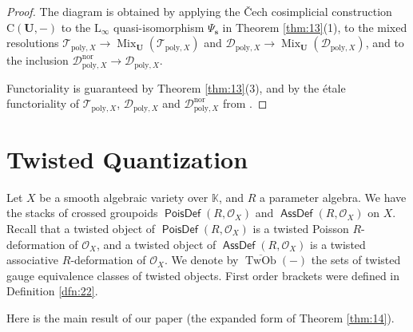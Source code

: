 \documentclass[a4paper, 10pt]{amsart}
\theoremstyle{definition}
\numberwithin{equation}{section}
\newcommand{\opn}{\operatorname}
\newcommand{\cat}[1]{\operatorname{\mathsf{#1}}}
\newcommand{\ol}{\overline}
\newcommand{\mcal}[1]{\mathcal{#1}}
\newcommand{\mrm}[1]{\mathrm{#1}}
\newcommand{\mbb}[1]{\mathbb{#1}}
\newcommand{\bsym}[1]{\boldsymbol{#1}}
\newcommand{\K}{\mbb{K}}
\newcommand{\OX}{\mcal{O}_X}
\newcommand{\twocat}[1]{\operatorname{\bsym{\cat{#1}}}}
\begin{document}
\begin{proof}
The diagram is obtained by applying the \v{C}ech cosimplicial
construction $\mrm{C}(\bsym{U} , -)$ to the  $\mrm{L}_{\infty}$
quasi-isomorphism $\Psi_{\bsym{s}}$
in  Theorem \ref{thm:13}(1), to the mixed resolutions 
$\mcal{T}_{\mrm{poly}, X} \to 
\opn{Mix}_{\bsym{U}}(\mcal{T}_{\mrm{poly}, X})$
and 
$\mcal{D}_{\mrm{poly}, X} \to 
\opn{Mix}_{\bsym{U}}(\mcal{D}_{\mrm{poly}, X})$, 
and to the inclusion 
$\mcal{D}_{\mrm{poly}, X}^{\mrm{nor}} \to 
\mcal{D}_{\mrm{poly}, X}$.

Functoriality is guaranteed by Theorem \ref{thm:13}(3), and by the 
\'etale functoriality of $\mcal{T}_{\mrm{poly}, X}$,
$\mcal{D}_{\mrm{poly}, X}$ and $\mcal{D}_{\mrm{poly}, X}^{\mrm{nor}}$
from \cite[Proposition 4.6]{Ye2}.
\end{proof}







\section{Twisted Quantization}
\label{sec:TDQ}

Let $X$ be a smooth algebraic variety over $\K$, and $R$ a parameter algebra.
We have the stacks of crossed groupoids 
$\twocat{PoisDef}(R, \mcal{O}_X)$ and 
$\twocat{AssDef}(R, \mcal{O}_X)$ on $X$.
Recall that a twisted object of $\twocat{PoisDef}(R, \mcal{O}_X)$
is a twisted Poisson $R$-deformation of $\OX$, and 
a twisted object of $\twocat{AssDef}(R, \mcal{O}_X)$
is a twisted associative $R$-deformation of $\OX$.
We denote by $\ol{\opn{TwOb}}(-)$ the sets of twisted gauge equivalence classes
of twisted objects. First order brackets were defined in Definition
\ref{dfn:22}.

Here is the main result of our paper (the expanded form of Theorem
\ref{thm:14}).
\end{document}
